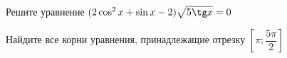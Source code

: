 \begin{ex}
	\begin{condition}
		\begin{enumcols}[label=\asbuk*)]
			\item Решите уравнение \( (2\cos^2 x +\sin x -2)\sqrt{5\tg x} = 0 \)
			\item Найдите все корни уравнения, принадлежащие отрезку \( \left[\pi;\dfrac{5\pi}{2}\right] \)
		\end{enumcols}
	\end{condition}
\end{ex}